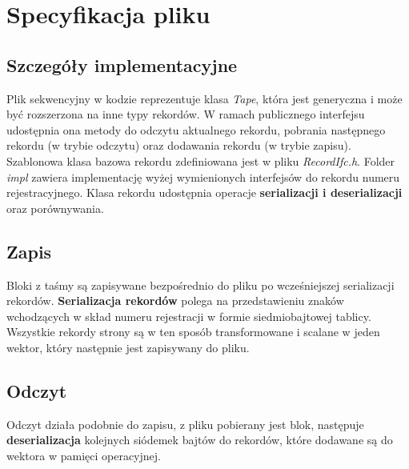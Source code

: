 \documentclass{article}
\begin{document}
\section{Specyfikacja pliku}
\subsection{Szczegóły implementacyjne}
Plik sekwencyjny w kodzie reprezentuje klasa \textit{Tape}, która jest generyczna i może być rozszerzona na inne typy rekordów. W ramach publicznego
interfejsu udostępnia ona metody do odczytu aktualnego rekordu, pobrania następnego rekordu (w trybie odczytu) oraz dodawania rekordu (w trybie zapisu).
Szablonowa klasa bazowa rekordu zdefiniowana jest w pliku \textit{RecordIfc.h}.  
Folder \textit{impl} zawiera implementację wyżej wymienionych interfejsów
do rekordu numeru rejestracyjnego.  Klasa rekordu udostępnia operacje \textbf{serializacji i deserializacji} oraz porównywania.
\subsection{Zapis}
Bloki z taśmy są zapisywane bezpośrednio do pliku po wcześniejszej serializacji rekordów. \textbf{Serializacja rekordów} polega na przedstawieniu 
znaków wchodzących w skład numeru rejestracji w formie siedmiobajtowej tablicy. Wszystkie rekordy strony są w ten sposób transformowane i 
scalane w jeden wektor, który następnie jest zapisywany do pliku. 
\subsection{Odczyt}
Odczyt działa podobnie do zapisu, z pliku pobierany jest blok, następuje \textbf{deserializacja} kolejnych siódemek bajtów do rekordów, które dodawane są do wektora w pamięci operacyjnej.
\end{document}
